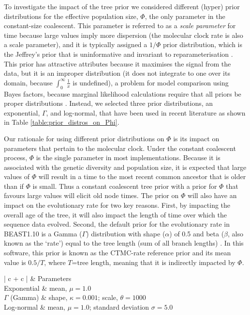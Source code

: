 \documentclass[10pt,letterpaper]{article}
\newlength\savedwidth
\newcommand\thickhline{\noalign{\global\savedwidth\arrayrulewidth\global\arrayrulewidth 2pt}%
\hline
\noalign{\global\arrayrulewidth\savedwidth}}
\begin{document}
To investigate the impact of the tree prior we considered different (hyper) prior distributions for the effective population size, $\Phi$, the only parameter in the constant-size coalescent. This parameter is referred to as a \textit{scale parameter} for time because large values imply more dispersion (the molecular clock rate is also a scale parameter), and it is typically assigned a $1/\Phi$ prior distribution, which is the Jeffrey's prior that is uninformative and invariant to reparameterisation  \cite{drummond2002estimating}. This prior has attractive attributes because it maximises the signal from the data, but it is an improper distribution (it does not integrate to one over its domain, because $\int_{0}^{\infty} \frac{1}{x}$ is undefined), a problem for model comparison using Bayes factors, because marginal likelihood calculations require that all priors be proper distributions \cite{r2019marginal, baele2013proper}. Instead, we selected three prior distributions, an exponential, $\Gamma$, and log-normal, that have been used in recent literature as shown in Table \ref{table:prior_distros_on_Phi}.

Our rationale for using different prior distributions on $\Phi$ is its impact on parameters that pertain to the molecular clock. Under the constant coalescent process, $\Phi$ is the single parameter in most implementations. Because it is associated with the genetic diversity and population size, it is expected that large values of $\Phi$ will result in a time to the most recent common ancestor that is older than if $\Phi$ is small. Thus a constant coalescent tree prior with a prior for $\Phi$ that favours large values will elicit old node times. The prior on $\Phi$ will also have an impact on the evolutionary rate for two key reasons. First, by impacting the overall age of the tree, it will also impact the length of time over which the sequence data evolved. Second, the default prior for the evolutionary rate in BEAST1.10 is a Gamma ($\Gamma$) distribution with shape ($\alpha$) of 0.5 and beta ($\beta$, also known as the `rate') equal to the tree length (sum of all branch lengths) \cite{wang2014priors, ferreira2008bayesian}. In this software, this prior is known as the CTMC-rate reference prior and its mean value is $0.5 / T$, where $T$=tree length, meaning that it is indirectly impacted by $\Phi$. 

\begin{table}[h]
\caption{Prior distributions for the effective population size, $\Phi$ parameter}
\begin{center} 
	\label{table:prior_distros_on_Phi}
	\begin{tabular}{| c + c |}
    \hline
		 & Parameters\\ \thickhline
		Exponential & mean, $\mu=1.0$\\ \hline
        $\Gamma$ (Gamma) & shape, $\kappa=0.001$; scale, $\theta=1000$\\ \hline
		Log-normal & mean, $\mu=1.0$; standard deviation $\sigma=5.0$\\ \hline
	\end{tabular}
\end{center}
\end{table}
\end{document}
